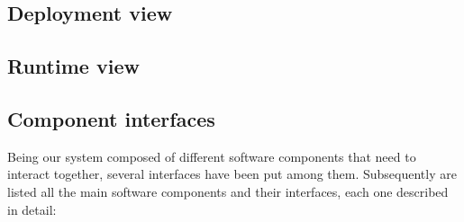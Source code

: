 \subsection{Deployment view}
\subsection{Runtime view}
\subsection{Component interfaces}
Being our system composed of different software components that need to interact together, several interfaces have been put among them.
Subsequently are listed all the main software components and their interfaces, each one described in detail:
